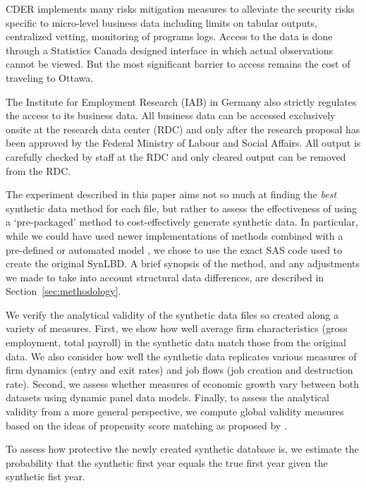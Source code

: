 CDER implements many risks mitigation measures to alleviate the security risks specific to micro-level business data including limits on tabular outputs, centralized vetting, monitoring of programs logs. Access to the data is done through a Statistics Canada designed interface in which actual observations cannot be viewed. But the most significant barrier to access remains the  cost of traveling to Ottawa.

The Institute for Employment Research (IAB) in Germany also strictly regulates the access to its business data. All business data can  be accessed exclusively onsite at the research data center (RDC) and only after the research proposal has been approved by the Federal Ministry of Labour and Social Affairs. All output is carefully checked by staff at the RDC and only cleared output can be removed  from the RDC. 

The experiment described in this paper aims not so much at finding the \textit{best} synthetic data method for each file, but rather to assess the effectiveness of using a `pre-packaged' method to cost-effectively generate synthetic data. In particular, while we could have used newer implementations of methods combined with a pre-defined or automated model \citep{JSSv074i11,Raab_Nowok_Dibben_2018}, we chose to use the exact SAS code used to create the original \ac{SynLBD}. A brief synopsis of the  method, and any adjustments we made to take into account structural data differences, are described in Section~\ref{sec:methodology}.

We verify the analytical validity of the synthetic data files so created along a variety of measures. First, we show how well average firm characteristics (gross employment, total payroll) in the synthetic data  match those from the original data. We also consider how well the synthetic data  replicates various measures of firm dynamics (entry and exit rates) and job flows (job creation and destruction rate). Second, we assess whether measures of economic growth vary between both datasets using dynamic panel data models. Finally, to assess the analytical validity from a more general perspective, we  compute global validity measures based on the ideas of propensity score matching as proposed by \citet{Woo_Reiter_Oganian_Karr_2009,Snoke_RSSA2018}.

To assess how protective the newly created synthetic database is, we estimate the probability that the synthetic first year equals the true first year given the synthetic fist year.

